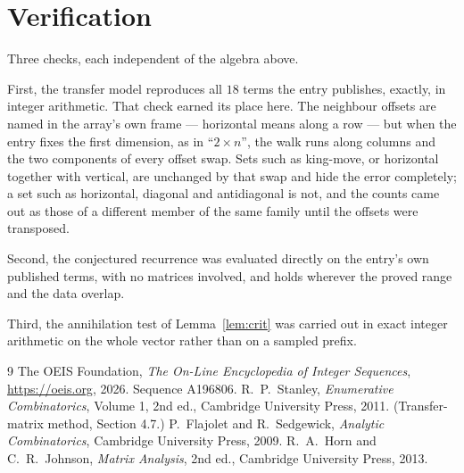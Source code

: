 \documentclass[11pt,a4paper]{article}
\theoremstyle{plain}
\theoremstyle{definition}
\begin{document}
\section{Verification}

Three checks, each independent of the algebra above.

First, the transfer model reproduces all $18$ terms the entry publishes, exactly, in
integer arithmetic. That check earned its place here. The neighbour offsets are named in the
array's own frame --- horizontal means along a row --- but when the entry fixes the first
dimension, as in ``$2\times n$'', the walk runs along columns and the two components of every
offset swap. Sets such as king-move, or horizontal together with vertical, are unchanged by
that swap and hide the error completely; a set such as horizontal, diagonal and antidiagonal
is not, and the counts came out as those of a different member of the same family until the
offsets were transposed.

Second, the conjectured recurrence was evaluated directly on the entry's own published terms,
with no matrices involved, and holds wherever the proved range and the data overlap.

Third, the annihilation test of Lemma~\ref{lem:crit} was carried out in exact integer
arithmetic on the whole vector rather than on a sampled prefix.

\begin{thebibliography}{9}
 The OEIS Foundation, \emph{The On-Line Encyclopedia of Integer
Sequences}, \url{https://oeis.org}, 2026. Sequence A196806.
 R.~P.~Stanley, \emph{Enumerative Combinatorics}, Volume 1, 2nd ed.,
Cambridge University Press, 2011. (Transfer-matrix method, Section 4.7.)
 P.~Flajolet and R.~Sedgewick, \emph{Analytic Combinatorics}, Cambridge
University Press, 2009.
 R.~A.~Horn and C.~R.~Johnson, \emph{Matrix Analysis}, 2nd ed., Cambridge
University Press, 2013.
\end{thebibliography}
\end{document}
